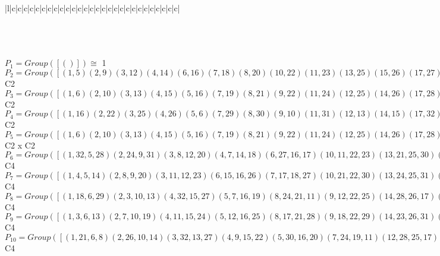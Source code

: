\documentclass[varwidth=\maxdimen,border=10]{standalone}
\begin{document}
\begin{tabular}
\begin{array}{|l|c|c|c|c|c|c|c|c|c|c|c|c|c|c|c|c|c|c|c|c|c|c|c|c|c|c|c|c|}
\end{array}\)\\
\ \\
\ \\
$P_{1} = Group( [ () ] )\cong$ 1\ \\
$P_{2} = Group( [ ( 1, 5)( 2, 9)( 3,12)( 4,14)( 6,16)( 7,18)( 8,20)(10,22)(11,23)(13,25)(15,26)(17,27)(19,29)(21,30)(24,31)(28,32) ] )\cong$ C2\ \\
$P_{3} = Group( [ ( 1, 6)( 2,10)( 3,13)( 4,15)( 5,16)( 7,19)( 8,21)( 9,22)(11,24)(12,25)(14,26)(17,28)(18,29)(20,30)(23,31)(27,32) ] )\cong$ C2\ \\
$P_{4} = Group( [ ( 1,16)( 2,22)( 3,25)( 4,26)( 5, 6)( 7,29)( 8,30)( 9,10)(11,31)(12,13)(14,15)(17,32)(18,19)(20,21)(23,24)(27,28) ] )\cong$ C2\ \\
$P_{5} = Group( [ ( 1, 6)( 2,10)( 3,13)( 4,15)( 5,16)( 7,19)( 8,21)( 9,22)(11,24)(12,25)(14,26)(17,28)(18,29)(20,30)(23,31)(27,32), ( 1, 5)( 2, 9)( 3,12)( 4,14)( 6,16)( 7,18)( 8,20)(10,22)(11,23)(13,25)(15,26)(17,27)(19,29)(21,30)(24,31)(28,32) ] )\cong$ C2 x C2\ \\
$P_{6} = Group( [ ( 1,32, 5,28)( 2,24, 9,31)( 3, 8,12,20)( 4, 7,14,18)( 6,27,16,17)(10,11,22,23)(13,21,25,30)(15,19,26,29), ( 1, 5)( 2, 9)( 3,12)( 4,14)( 6,16)( 7,18)( 8,20)(10,22)(11,23)(13,25)(15,26)(17,27)(19,29)(21,30)(24,31)(28,32) ] )\cong$ C4\ \\
$P_{7} = Group( [ ( 1, 4, 5,14)( 2, 8, 9,20)( 3,11,12,23)( 6,15,16,26)( 7,17,18,27)(10,21,22,30)(13,24,25,31)(19,28,29,32), ( 1, 5)( 2, 9)( 3,12)( 4,14)( 6,16)( 7,18)( 8,20)(10,22)(11,23)(13,25)(15,26)(17,27)(19,29)(21,30)(24,31)(28,32) ] )\cong$ C4\ \\
$P_{8} = Group( [ ( 1,18, 6,29)( 2, 3,10,13)( 4,32,15,27)( 5, 7,16,19)( 8,24,21,11)( 9,12,22,25)(14,28,26,17)(20,31,30,23), ( 1, 6)( 2,10)( 3,13)( 4,15)( 5,16)( 7,19)( 8,21)( 9,22)(11,24)(12,25)(14,26)(17,28)(18,29)(20,30)(23,31)(27,32) ] )\cong$ C4\ \\
$P_{9} = Group( [ ( 1, 3, 6,13)( 2, 7,10,19)( 4,11,15,24)( 5,12,16,25)( 8,17,21,28)( 9,18,22,29)(14,23,26,31)(20,27,30,32), ( 1, 6)( 2,10)( 3,13)( 4,15)( 5,16)( 7,19)( 8,21)( 9,22)(11,24)(12,25)(14,26)(17,28)(18,29)(20,30)(23,31)(27,32) ] )\cong$ C4\ \\
$P_{10} = Group( [ ( 1,21, 6, 8)( 2,26,10,14)( 3,32,13,27)( 4, 9,15,22)( 5,30,16,20)( 7,24,19,11)(12,28,25,17)(18,31,29,23), ( 1, 6)( 2,10)( 3,13)( 4,15)( 5,16)( 7,19)( 8,21)( 9,22)(11,24)(12,25)(14,26)(17,28)(18,29)(20,30)(23,31)(27,32) ] )\cong$ C4\ \\

\end{tabular}
\end{document}
